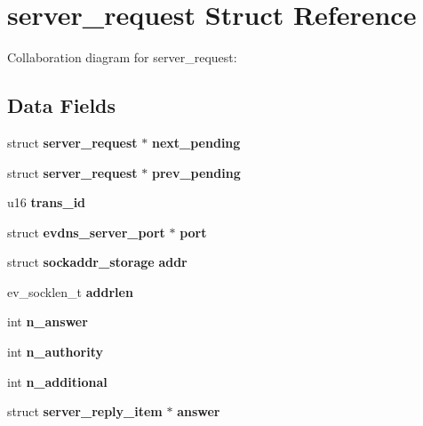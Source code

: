 \section{server\-\_\-request \-Struct \-Reference}
\label{structserver__request}


\-Collaboration diagram for server\-\_\-request\-:
\subsection*{\-Data \-Fields}
\begin{DoxyCompactItemize}
\item 
struct {\bf server\-\_\-request} $\ast$ {\bfseries next\-\_\-pending}\label{structserver__request_acbf23d5960521abde1fb447babd5f59f}

\item 
struct {\bf server\-\_\-request} $\ast$ {\bfseries prev\-\_\-pending}\label{structserver__request_ade8cd3f16b36db3688afbd77747de812}

\item 
u16 {\bfseries trans\-\_\-id}\label{structserver__request_a84c6bbef770a9b5f8f7c33ce3842a436}

\item 
struct {\bf evdns\-\_\-server\-\_\-port} $\ast$ {\bfseries port}\label{structserver__request_a56729fd244e435a7be531b5972541066}

\item 
struct {\bf sockaddr\-\_\-storage} {\bfseries addr}\label{structserver__request_a7fe4b3f87e7a49d2520a0d26563bb921}

\item 
ev\-\_\-socklen\-\_\-t {\bfseries addrlen}\label{structserver__request_a6880b3fcdc638f79016883fc28654a04}

\item 
int {\bfseries n\-\_\-answer}\label{structserver__request_a3411f0c13d4188861ca97b50fdaad5e5}

\item 
int {\bfseries n\-\_\-authority}\label{structserver__request_a05e55a8dafdc094f667af6e1de2f5062}

\item 
int {\bfseries n\-\_\-additional}\label{structserver__request_a797c1a6c81ea491d37b13cf206e509ea}

\item 
struct {\bf server\-\_\-reply\-\_\-item} $\ast$ {\bfseries answer}\label{structserver__request_ac4718b31bc19c54de6484f13814b31eb}


\end{DoxyCompactItemize}
